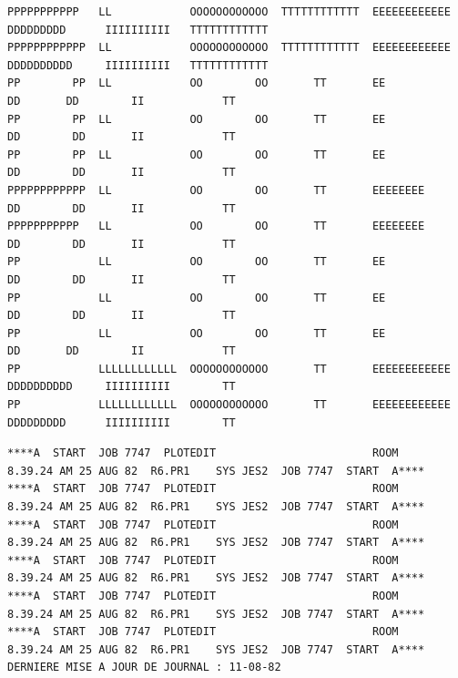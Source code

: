 

{\fontsize{4}{5}\selectfont
\begin{verbatim}
PPPPPPPPPPP   LL            OOOOOOOOOOOO  TTTTTTTTTTTT  EEEEEEEEEEEE  DDDDDDDDD      IIIIIIIIII   TTTTTTTTTTTT
PPPPPPPPPPPP  LL            OOOOOOOOOOOO  TTTTTTTTTTTT  EEEEEEEEEEEE  DDDDDDDDDD     IIIIIIIIII   TTTTTTTTTTTT
PP        PP  LL            OO        OO       TT       EE            DD       DD        II            TT
PP        PP  LL            OO        OO       TT       EE            DD        DD       II            TT
PP        PP  LL            OO        OO       TT       EE            DD        DD       II            TT
PPPPPPPPPPPP  LL            OO        OO       TT       EEEEEEEE      DD        DD       II            TT
PPPPPPPPPPP   LL            OO        OO       TT       EEEEEEEE      DD        DD       II            TT
PP            LL            OO        OO       TT       EE            DD        DD       II            TT
PP            LL            OO        OO       TT       EE            DD        DD       II            TT
PP            LL            OO        OO       TT       EE            DD       DD        II            TT
PP            LLLLLLLLLLLL  OOOOOOOOOOOO       TT       EEEEEEEEEEEE  DDDDDDDDDD     IIIIIIIIII        TT
PP            LLLLLLLLLLLL  OOOOOOOOOOOO       TT       EEEEEEEEEEEE  DDDDDDDDD      IIIIIIIIII        TT
\end{verbatim}
}


{\fontsize{4}{5}\selectfont
\begin{verbatim}
****A  START  JOB 7747  PLOTEDIT                        ROOM        8.39.24 AM 25 AUG 82  R6.PR1    SYS JES2  JOB 7747  START  A****
****A  START  JOB 7747  PLOTEDIT                        ROOM        8.39.24 AM 25 AUG 82  R6.PR1    SYS JES2  JOB 7747  START  A****
****A  START  JOB 7747  PLOTEDIT                        ROOM        8.39.24 AM 25 AUG 82  R6.PR1    SYS JES2  JOB 7747  START  A****
****A  START  JOB 7747  PLOTEDIT                        ROOM        8.39.24 AM 25 AUG 82  R6.PR1    SYS JES2  JOB 7747  START  A****
****A  START  JOB 7747  PLOTEDIT                        ROOM        8.39.24 AM 25 AUG 82  R6.PR1    SYS JES2  JOB 7747  START  A****
****A  START  JOB 7747  PLOTEDIT                        ROOM        8.39.24 AM 25 AUG 82  R6.PR1    SYS JES2  JOB 7747  START  A****
DERNIERE MISE A JOUR DE JOURNAL : 11-08-82
\end{verbatim}
}

